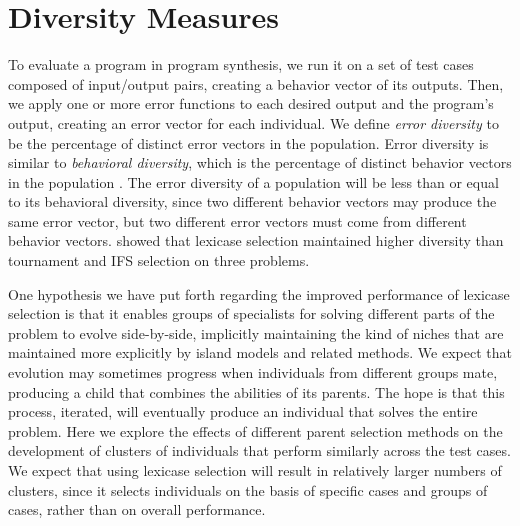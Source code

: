\section{Diversity Measures}


To evaluate a program in program synthesis, we run it on a set of test cases composed of input/output pairs, creating a behavior vector of its outputs. Then, we apply one or more error functions to each desired output and the program's output, creating an error vector for each individual. We define \textit{error diversity} to be the percentage of distinct error vectors in the population. Error diversity is similar to \textit{behavioral diversity}, which is the percentage of distinct behavior vectors in the population \citep{Jackson:2010:PPSN}. The error diversity of a population will be less than or equal to its behavioral diversity, since two different behavior vectors may produce the same error vector, but two different error vectors must come from different behavior vectors.
\cite{Helmuth:2014:ieeeTEC} showed that lexicase selection maintained higher diversity than tournament and IFS selection on three problems.

One hypothesis we have put forth regarding the improved performance of lexicase selection is that it enables groups of specialists for solving different parts of the problem to evolve side-by-side, implicitly maintaining the kind of niches that are maintained more explicitly by island models and related methods. We expect that evolution may sometimes progress when individuals from different groups mate, producing a child that combines the abilities of its parents. The hope is that this process, iterated, will eventually produce an individual that solves the entire problem. Here we explore the effects of different parent selection methods on the development of clusters of individuals that perform similarly across the test cases. We expect that using lexicase selection will result in relatively larger numbers of clusters, since it selects individuals on the basis of specific cases and groups of cases, rather than on overall performance.


